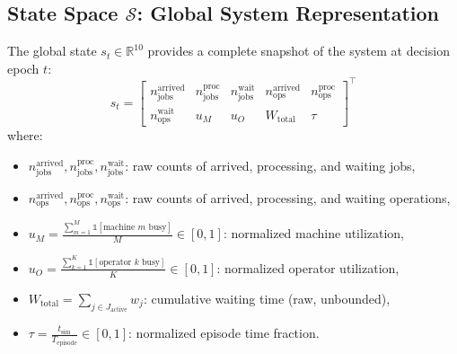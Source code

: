 \subsection{State Space $\mathcal{S}$: Global System Representation}
The global state \( s_t \in \mathbb{R}^{10} \) provides a complete snapshot of the system at decision epoch \( t \):
\begin{equation}
s_t = \begin{bmatrix}
n_{\text{jobs}}^{\text{arrived}} & n_{\text{jobs}}^{\text{proc}} & n_{\text{jobs}}^{\text{wait}} & n_{\text{ops}}^{\text{arrived}} & n_{\text{ops}}^{\text{proc}} \\
n_{\text{ops}}^{\text{wait}} & u_M & u_O & W_{\text{total}} & \tau
\end{bmatrix}^\top
\end{equation}
where:
\begin{itemize}
    \item \( n_{\text{jobs}}^{\text{arrived}}, n_{\text{jobs}}^{\text{proc}}, n_{\text{jobs}}^{\text{wait}} \): raw counts of arrived, processing, and waiting jobs,
    \item \( n_{\text{ops}}^{\text{arrived}}, n_{\text{ops}}^{\text{proc}}, n_{\text{ops}}^{\text{wait}} \): raw counts of arrived, processing, and waiting operations,
    \item \( u_M = \frac{\sum_{m=1}^{M} \mathbb{1}[\text{machine } m \text{ busy}]}{M} \in [0,1] \): normalized machine utilization,
    \item \( u_O = \frac{\sum_{k=1}^{K} \mathbb{1}[\text{operator } k \text{ busy}]}{K} \in [0,1] \): normalized operator utilization,
    \item \( W_{\text{total}} = \sum_{j \in J_{\text{active}}} w_j \): cumulative waiting time (raw, unbounded),
    \item \( \tau = \frac{t_{\text{sim}}}{T_{\text{episode}}} \in [0,1] \): normalized episode time fraction.
\end{itemize}

